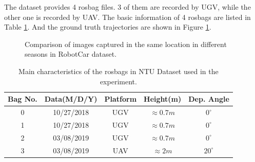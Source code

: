 The dataset provides 4 rosbag files. 3 of them are recorded by UGV, while the other one is recorded by UAV. The basic information of 4 rosbags are listed in Table \ref{tbl:ntubagsinfo}. And the ground truth trajectories are shown in Figure \ref{fig:ntugt}.

\begin{figure}
	\centering
	\vfill
	\caption{Comparison of images captured in the same location in different seasons in RobotCar dataset.}
	\label{fig:ntugt}
\end{figure}

\begin{table}
	\centering
	\caption{Main characteristics of the rosbags in NTU Dataset used in the experiment.}
	\begin{tabular}{|c|c|c|c|c|}
		\hline
		Bag No. & Data(M/D/Y)  & Platform & Height(m) & Dep. Angle  \\
		\hline
		0&10/27/2018& UGV & $\approx 0.7m$ & $0^\circ$ \\
		\hline
		1&10/27/2018& UGV & $\approx 0.7m$ & $0^\circ$ \\
		\hline
		2&03/08/2019& UGV & $\approx 0.7m$ & $0^\circ$ \\
		\hline
		3&03/08/2019& UAV & $\approx 2m$ & $20^\circ$ \\
		\hline
	\end{tabular}
	\label{tbl:ntubagsinfo}
\end{table}

